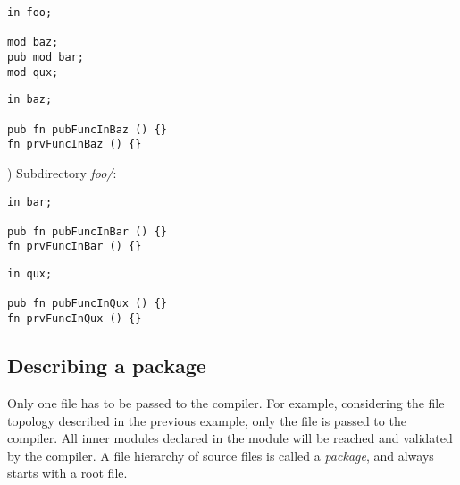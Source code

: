 \vspace{-5pt}%
\begin{minipage}[t][][t]{0.47\linewidth}
\begin{lstlisting}[caption=\textit{./foo.yr}, style=coloredverbatim]
in foo;

mod baz;
pub mod bar;
mod qux;

\end{lstlisting}
\end{minipage}\hspace{5pt}%
\begin{minipage}[t][][t]{0.47\linewidth}
\begin{lstlisting}[caption=\textit{./baz.yr}, style=coloredverbatim]
in baz;

pub fn pubFuncInBaz () {}
fn prvFuncInBaz () {}
\end{lstlisting}
\end{minipage}


) Subdirectory \textit{foo/}:

\vspace{-5pt}%
\begin{minipage}[t][][t]{0.47\linewidth}
\begin{lstlisting}[caption=\textit{./foo/bar.yr}, style=coloredverbatim]
in bar;

pub fn pubFuncInBar () {}
fn prvFuncInBar () {}
\end{lstlisting}
\end{minipage}\hspace{5pt}%
\begin{minipage}[t][][t]{0.47\linewidth}
\begin{lstlisting}[caption=\textit{./foo/qux.yr}, style=coloredverbatim]
in qux;

pub fn pubFuncInQux () {}
fn prvFuncInQux () {}
\end{lstlisting}
\end{minipage}

\subsection{Describing a package}

Only one file has to be passed to the compiler. For example, considering the
file topology described in the previous example, only the  file
is passed to the compiler. All inner modules declared in the  module
will be reached and validated by the compiler. A file hierarchy of source files
is called a \emph{package}, and always starts with a root file.

